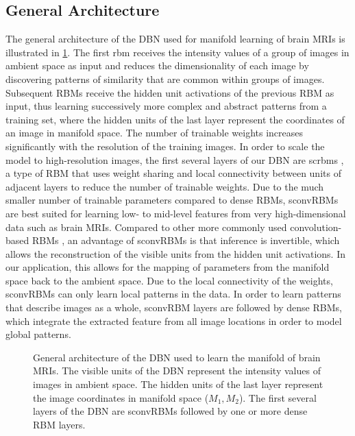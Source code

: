 \subsection[General architecture]{General Architecture}
\label{sec:general_arch}

The general architecture of the DBN used for manifold learning of brain MRIs is
illustrated in \ref{fig:manidbn}. The first \gls{rbm}
\citep{freund1992,hinton2010a} receives the intensity values of a group of
images in ambient space as input and reduces the dimensionality of each image by
discovering patterns of similarity that are common within groups of images.
Subsequent RBMs receive the hidden unit activations of the previous RBM as
input, thus learning successively more complex and abstract patterns from a
training set, where the hidden units of the last layer represent the coordinates
of an image in manifold space. The number of trainable weights increases
significantly with the resolution of the training images. In order to scale the
model to high-resolution images, the first several layers of our DBN are
\glspl{scrbm} \citep{brosch2015efficient}, a type of RBM that uses weight
sharing and local connectivity between units of adjacent layers to reduce the
number of trainable weights. Due to the much smaller number of trainable
parameters compared to dense RBMs, sconvRBMs are best suited for learning low-
to mid-level features from very high-dimensional data such as brain MRIs.
Compared to other more commonly used convolution-based RBMs \citep{lee2009}, an
advantage of sconvRBMs is that inference is invertible, which allows the
reconstruction of the visible units from the hidden unit activations. In our
application, this allows for the mapping of parameters from the manifold space
back to the ambient space. Due to the local connectivity of the weights,
sconvRBMs can only learn local patterns in the data. In order to learn patterns
that describe images as a whole, sconvRBM layers are followed by dense RBMs,
which integrate the extracted feature from all image locations in order to model
global patterns.

\begin{figure}
\centering


\caption[General architecture of the DBN used to learn the manifold of brain
MRIs]{General architecture of the DBN used to learn the manifold of brain
MRIs. The visible units of the DBN represent the intensity values of images in
ambient space. The hidden units of the last layer represent the image
coordinates in manifold space ($M_1, M_2$). The first several layers of the DBN
are sconvRBMs followed by one or more dense RBM layers.}

\label{fig:manidbn}
\end{figure}

